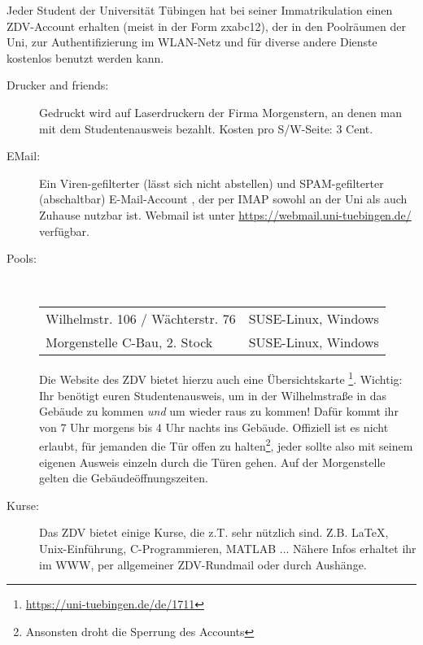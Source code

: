 Jeder Student der Universität Tübingen hat bei seiner Immatrikulation einen ZDV-Account erhalten (meist in der Form zxabc12), der in den Poolräumen der Uni, zur Authentifizierung im WLAN-Netz und für diverse andere Dienste kostenlos benutzt werden kann. 

\begin{description}

  \item[Drucker and friends:]
    Gedruckt wird auf Laserdruckern der Firma Morgenstern, an denen man mit dem Studentenausweis bezahlt. Kosten pro S/W-Seite:
    3 Cent.

  \item[EMail:]
    Ein Viren-gefilterter (lässt sich nicht abstellen) und SPAM-gefilterter
    (abschaltbar) E-Mail-Account ,
    der per IMAP sowohl an der Uni als auch Zuhause nutzbar ist. Webmail ist unter \url{https://webmail.uni-tuebingen.de/} verfügbar. 

  \item[Pools:] ~\\
    \begin{tabular}{ll}
      Wilhelmstr. 106 / Wächterstr. 76 &                SUSE-Linux, Windows \\
      Morgenstelle C-Bau, 2. Stock &            SUSE-Linux, Windows \\
    \end{tabular}

    Die Website des ZDV bietet hierzu auch eine Übersichtskarte
    \footnote{\url{https://uni-tuebingen.de/de/1711}}.	%
    Wichtig: Ihr benötigt euren Studentenausweis, um in der Wilhelmstraße in das Gebäude zu kommen \emph{und} um wieder raus zu kommen! Dafür kommt ihr von 7 Uhr morgens bis 4 Uhr nachts ins Gebäude. Offiziell ist es nicht erlaubt, für jemanden die Tür offen zu halten\footnote{Ansonsten droht die Sperrung des Accounts}, jeder sollte also mit seinem eigenen Ausweis einzeln durch die Türen gehen. Auf der Morgenstelle gelten die Gebäudeöffnungszeiten.

  \item[Kurse:]
    Das ZDV bietet einige Kurse, die z.T. sehr nützlich sind. Z.B. \LaTeX,
    Unix-Ein\-führ\-ung, C-Programmieren, MATLAB ... Nähere Infos erhaltet ihr im
    WWW, per allgemeiner ZDV-Rundmail oder durch Aushänge.


\end{description}
